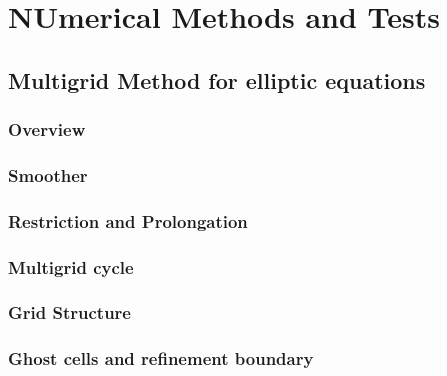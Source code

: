 
\chapter{NUmerical Methods and Tests}  %

\ifpdf
    \graphicspath{{Chapter4/Figs/PDF/}{Chapter4/Figs/}}
\else
    \graphicspath{{Chapter4/Figs/}}
\fi


\section{Multigrid Method for elliptic equations} %
\label{section4.1}

\subsection{Overview} %
\label{section4.1.1}

\subsection{Smoother} %
\label{section4.1.2}

\subsection{Restriction and Prolongation} %
\label{section4.1.3}

\subsection{Multigrid cycle} %
\label{section4.1.4}

\subsection{Grid Structure} %
\label{section4.1.5}

\subsection{Ghost cells and refinement boundary} %
\label{section4.1.6}

